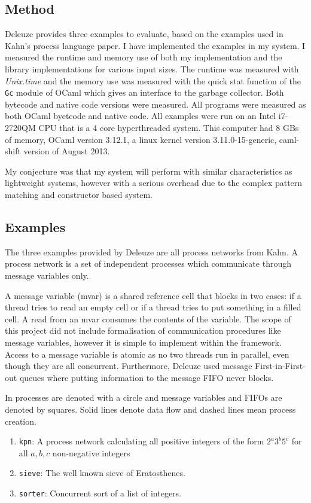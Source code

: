 \documentclass[12pt,twoside,notitlepage]{report}
\theoremstyle{plain}%
\theoremstyle{definition}
\theoremstyle{remark}
\begin{document}
\subsection{Method}
Deleuze provides three examples to evaluate, based on the examples used in Kahn's process language paper\cite{kahn1976coroutines}. I have implemented the examples in my system. I measured the runtime and memory use of both my implementation and the library implementations for various input sizes. The runtime was measured with \textit{Unix.time} and the memory use was measured with the quick stat function of the \verb|Gc| module of OCaml which gives an interface to the garbage collector. Both bytecode and native code versions were measured. All programs were measured as both OCaml byetcode and native code. All examples were run on an Intel i7-2720QM CPU that is a 4 core hyperthreaded system. This computer had 8 GBs of memory, OCaml version 3.12.1, a linux kernel version 3.11.0-15-generic, caml-shift version of August 2013.


My conjecture was that my system will perform with similar characteristics as lightweight systems, however with a serious overhead due to the complex pattern matching and constructor based system.
\subsection{Examples}
The three examples provided by Deleuze are all process networks from Kahn\cite{kahn1976coroutines}. A process network is a set of independent processes which communicate through message variables only. 

A message variable (mvar) is a shared reference cell that blocks in two cases: if a thread tries to read an empty cell or if a thread tries to put something in a filled cell. A read from an mvar consumes the contents of the variable. The scope of this project did not include formalisation of communication procedures like message variables, however it is simple to implement within the framework. Access to a message variable is atomic as no two threads run in parallel, even though they are all concurrent. Furthermore, Deleuze used message First-in-First-out queues where putting information to the message FIFO never blocks. 

In  processes are denoted with a circle and message variables and FIFOs are denoted by squares. Solid lines denote data flow and dashed lines mean process creation.
\begin{enumerate}
\item{\verb|kpn|: A process network calculating all positive integers of the form $ 2^a3^b5^c $ for all $ a,b,c $ non-negative integers}
\item{\verb|sieve|: The well known sieve of Eratosthenes.}
\item{\verb|sorter|: Concurrent sort of a list of integers.}
\end{enumerate}
\end{document}

